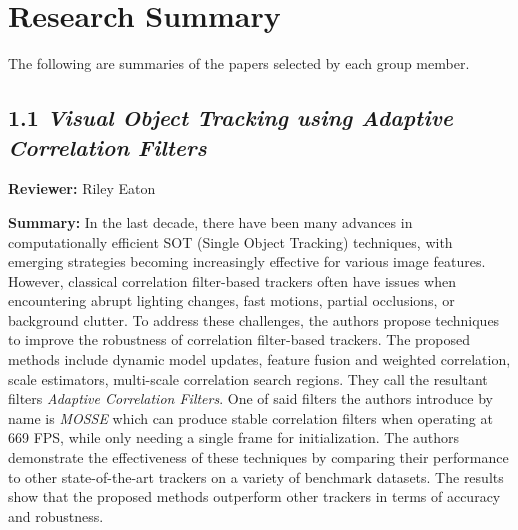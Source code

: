 \documentclass{article}
\begin{document}
\section*{Research Summary}

The following are summaries of the papers selected by each group member.

\subsection*{1.1 \textit{Visual Object Tracking using Adaptive Correlation Filters}}

\hspace*{\parindent}\textbf{Reviewer:} Riley Eaton

\vspace{0.3cm}

\textbf{Summary:} In the last decade, there have been many advances in computationally efficient SOT (Single Object Tracking) techniques, with emerging strategies becoming increasingly effective for various image features. However, classical correlation filter-based trackers often have issues when encountering abrupt lighting changes, fast motions, partial occlusions, or background clutter. To address these challenges, the authors propose techniques to improve the robustness of correlation filter-based trackers. The proposed methods include dynamic model updates, feature fusion and weighted correlation, scale estimators, multi-scale correlation search regions. They call the resultant filters \emph{Adaptive Correlation Filters}. One of said filters the authors introduce by name is \emph{MOSSE} which can produce stable correlation filters when operating at 669 FPS, while only needing a single frame for initialization. The authors demonstrate the effectiveness of these techniques by comparing their performance to other state-of-the-art trackers on a variety of benchmark datasets. The results show that the proposed methods outperform other trackers in terms of accuracy and robustness.

\vspace{0.3cm}
\end{document}
